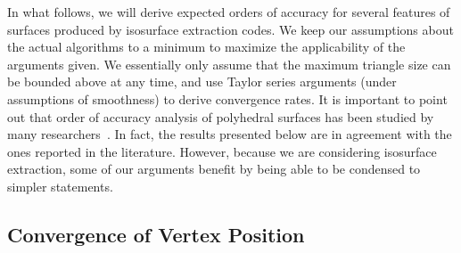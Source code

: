 


In what follows, we will derive expected orders of accuracy for
several features of surfaces produced by isosurface extraction codes. We keep
our assumptions about the actual algorithms to a minimum to maximize
the applicability of the arguments given. We essentially only assume
that the maximum triangle size can be bounded above at any time, and
use Taylor series arguments (under assumptions of smoothness) 
to derive convergence rates. 
%
It is important to point out that order of accuracy analysis of
polyhedral surfaces has been studied by many
researchers~\cite{meek2000,xu2006,zxuLNCS05,hildebrandt06}.  In
fact, the results presented below are in agreement with the ones
reported in the literature. However, because we are considering
isosurface extraction, some of our arguments benefit by being
able to be condensed to simpler statements.

\subsection{Convergence of Vertex Position}
\label{subchap1:sec:vertex-order-of-accuracy}


